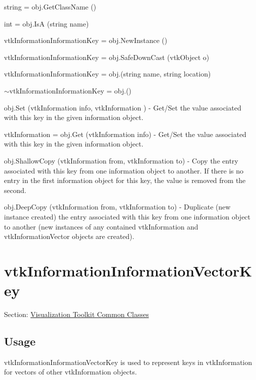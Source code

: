 \begin{DoxyItemize}
\item {\ttfamily string = obj.\-Get\-Class\-Name ()}  
\item {\ttfamily int = obj.\-Is\-A (string name)}  
\item {\ttfamily vtk\-Information\-Information\-Key = obj.\-New\-Instance ()}  
\item {\ttfamily vtk\-Information\-Information\-Key = obj.\-Safe\-Down\-Cast (vtk\-Object o)}  
\item {\ttfamily vtk\-Information\-Information\-Key = obj.(string name, string location)}  
\item {\ttfamily $\sim$vtk\-Information\-Information\-Key = obj.()}  
\item {\ttfamily obj.\-Set (vtk\-Information info, vtk\-Information )} -\/ Get/\-Set the value associated with this key in the given information object.  
\item {\ttfamily vtk\-Information = obj.\-Get (vtk\-Information info)} -\/ Get/\-Set the value associated with this key in the given information object.  
\item {\ttfamily obj.\-Shallow\-Copy (vtk\-Information from, vtk\-Information to)} -\/ Copy the entry associated with this key from one information object to another. If there is no entry in the first information object for this key, the value is removed from the second.  
\item {\ttfamily obj.\-Deep\-Copy (vtk\-Information from, vtk\-Information to)} -\/ Duplicate (new instance created) the entry associated with this key from one information object to another (new instances of any contained vtk\-Information and vtk\-Information\-Vector objects are created).  
\end{DoxyItemize}\hypertarget{vtkcommon_vtkinformationinformationvectorkey}{}\section{vtk\-Information\-Information\-Vector\-Key}\label{vtkcommon_vtkinformationinformationvectorkey}
Section\-: \hyperlink{sec_vtkcommon}{Visualization Toolkit Common Classes} \hypertarget{vtkwidgets_vtkxyplotwidget_Usage}{}\subsection{Usage}\label{vtkwidgets_vtkxyplotwidget_Usage}
vtk\-Information\-Information\-Vector\-Key is used to represent keys in vtk\-Information for vectors of other vtk\-Information objects.

